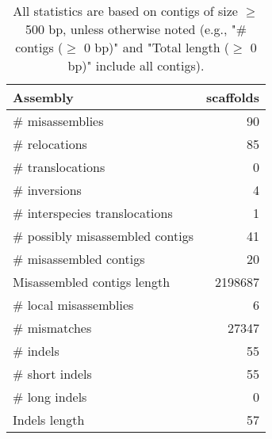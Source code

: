 \documentclass[12pt,a4paper]{article}
\begin{document}
\begin{table}[ht]
\begin{center}
\caption{All statistics are based on contigs of size $\geq$ 500 bp, unless otherwise noted (e.g., "\# contigs ($\geq$ 0 bp)" and "Total length ($\geq$ 0 bp)" include all contigs).}
\begin{tabular}{|l*{1}{|r}|}
\hline
Assembly & scaffolds \\ \hline
\# misassemblies & 90 \\ \hline
\hspace{5mm}\# relocations & 85 \\ \hline
\hspace{5mm}\# translocations & 0 \\ \hline
\hspace{5mm}\# inversions & 4 \\ \hline
\hspace{5mm}\# interspecies translocations & 1 \\ \hline
\# possibly misassembled contigs & 41 \\ \hline
\# misassembled contigs & 20 \\ \hline
Misassembled contigs length & 2198687 \\ \hline
\# local misassemblies & 6 \\ \hline
\# mismatches & 27347 \\ \hline
\# indels & 55 \\ \hline
\hspace{5mm}\# short indels & 55 \\ \hline
\hspace{5mm}\# long indels & 0 \\ \hline
Indels length & 57 \\ \hline
\end{tabular}
\end{center}
\end{table}
\end{document}
